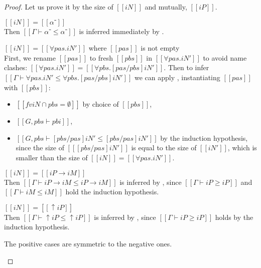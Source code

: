 \lemmaSubtypingReflexivity*
\begin{proof}
  Let us prove it by the size of $[[iN]]$ and mutually, $[[iP]]$.
  \begin{caseof}
    \item $[[iN]] = [[α⁻]]$\\
      Then $[[Γ ⊢ α⁻ ≤ α⁻]]$ is inferred immediately by .
    \item $[[iN]] = [[∀pas.iN']]$ where $[[pas]]$ is not empty\\
      First, we rename $[[pas]]$ to fresh $[[pbs]]$ in $[[∀pas.iN']]$ to avoid
      name clashes: $[[∀pas.iN']] = [[∀pbs.[pas/pbs]iN']]$.
      Then to infer $[[Γ ⊢ ∀pas.iN' ≤ ∀pbs.[pas/pbs]iN']]$ we can apply 
      , instantiating $[[pas]]$ with $[[pbs]]$:
      \begin{itemize}
        \item $[[fv iN ∩ {pbs} = ∅ ]]$ by choice of $[[pbs]]$,
        \item $[[G, pbs ⊢ pbi]]$,
        \item $[[G, pbs ⊢ [pbs/pas] iN' ≤ [pbs/pas] iN']]$ by the induction hypothesis,
        since the size of $[[ [pbs/pas]iN' ]]$ is equal to the size of $[[iN']]$,
        which is smaller than the size of $[[iN]] = [[∀pas.iN']]$.
      \end{itemize}
    \item $[[iN]] = [[iP → iM]]$\\
      Then $[[Γ ⊢ iP → iM ≤ iP → iM]]$ is inferred by ,
      since $[[Γ ⊢ iP ≥ iP]]$ and $[[Γ ⊢ iM ≤ iM]]$ hold the induction hypothesis. 
    \item $[[iN]] = [[↑iP]]$\\
      Then $[[Γ ⊢ ↑iP ≤ ↑iP]]$ is inferred by ,
      since $[[Γ ⊢ iP ≥ iP]]$ holds by the induction hypothesis.
    \item The positive cases are symmetric to the negative ones.
  \end{caseof}
\end{proof}


